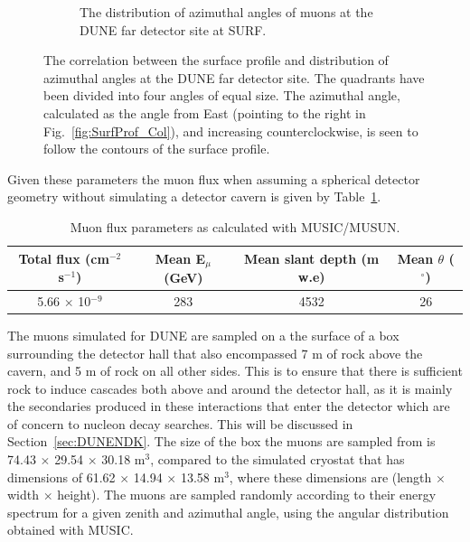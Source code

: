 \begin{figure}[h!]
\begin{subfigure}{0.45\textwidth}
    \caption{The distribution of azimuthal angles of muons at the DUNE far detector site at SURF.}
    \label{fig:SurfProf_Azi}
  \end{subfigure}
  \caption[The correlation between the surface profile and distribution of azimuthal angles at the DUNE far detector site]
          {The correlation between the surface profile and distribution of azimuthal angles at the DUNE far detector site. The quadrants have been divided into four angles of equal size. The azimuthal angle, calculated as the angle from East (pointing to the right in Fig.~\ref{fig:SurfProf_Col}), and increasing counterclockwise, is seen to follow the contours of the surface profile.}
\end{figure}

Given these parameters the muon flux when assuming a spherical detector geometry without simulating a detector cavern is given by Table~\ref{tab:MUSUNflux}. \\
\begin{table}[h!]
\caption[Muon flux parameters as calculated with MUSIC/MUSUN.]
        {Muon flux parameters as calculated with MUSIC/MUSUN.}
\centering
\label{tab:MUSUNflux}
\begin{tabular}{c c c c}
\toprule
{Total flux (cm$^{-2}$ s$^{-1}$)} & {Mean E$_{\mu}$ (GeV)} & {Mean slant depth (m w.e)} & {Mean $\theta$ ($^{\circ}$)} \\ 
\midrule
5.66 $\times$ 10$^{-9}$           & 283                    & 4532                       & 26                           \\
\bottomrule
\end{tabular}
\end{table}

The muons simulated for DUNE are sampled on a the surface of a box surrounding the detector hall that also encompassed 7 m of rock above the cavern, and 5 m of rock on all other sides. This is to ensure that there is sufficient rock to induce cascades both above and around the detector hall, as it is mainly the secondaries produced in these interactions that enter the detector which are of concern to nucleon decay searches. This will be discussed in Section~\ref{sec:DUNENDK}. The size of the box the muons are sampled from is 74.43 $\times$ 29.54 $\times$ 30.18 m$^3$, compared to the simulated cryostat that has dimensions of 61.62 $\times$ 14.94 $\times$ 13.58 m$^3$, where these dimensions are (length $\times$ width $\times$ height). The muons are sampled randomly according to their energy spectrum for a given zenith and azimuthal angle, using the angular distribution obtained with MUSIC. \\

